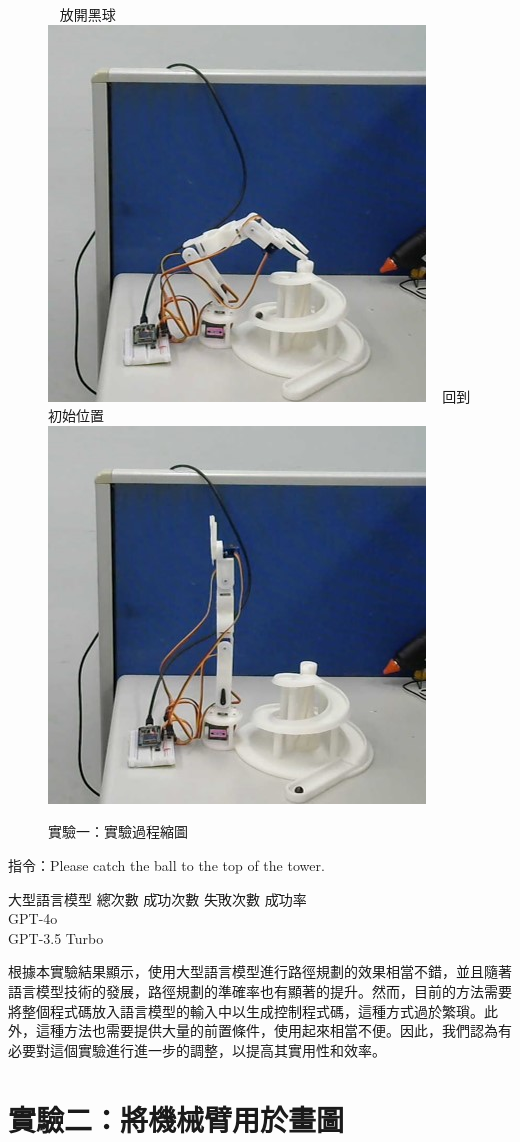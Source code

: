 \documentclass[class=NCU_thesis, crop=false]{standalone}
\begin{document}
\begin{figure}[!hbt]
    ~    
    \subcaptionbox
        {放開黑球
        \label{fig:fig-dataset-contrast-after-adjustment}}
        {\includegraphics[width=0.4\linewidth]{figures/TB (5).jpg}}
    ~
    \subcaptionbox
        {回到初始位置
        \label{fig:fig-dataset-contrast-after-adjustment}}
        {\includegraphics[width=0.4\linewidth]{figures/TB (6).jpg}}   
\caption{實驗一：實驗過程縮圖}
\end{figure}

指令：Please catch the ball to the top of the tower. 
\begin{tabbing}
    大型語言模型 \= 總次數 \= 成功次數 \= 失敗次數 \= 成功率 \\
    GPT-4o   \\
    GPT-3.5 Turbo    \\
\end{tabbing}

根據本實驗結果顯示，使用大型語言模型進行路徑規劃的效果相當不錯，並且隨著語言模型技術的發展，路徑規劃的準確率也有顯著的提升。然而，目前的方法需要將整個程式碼放入語言模型的輸入中以生成控制程式碼，這種方式過於繁瑣。此外，這種方法也需要提供大量的前置條件，使用起來相當不便。因此，我們認為有必要對這個實驗進行進一步的調整，以提高其實用性和效率。

\section{實驗二：將機械臂用於畫圖}
\end{document}

